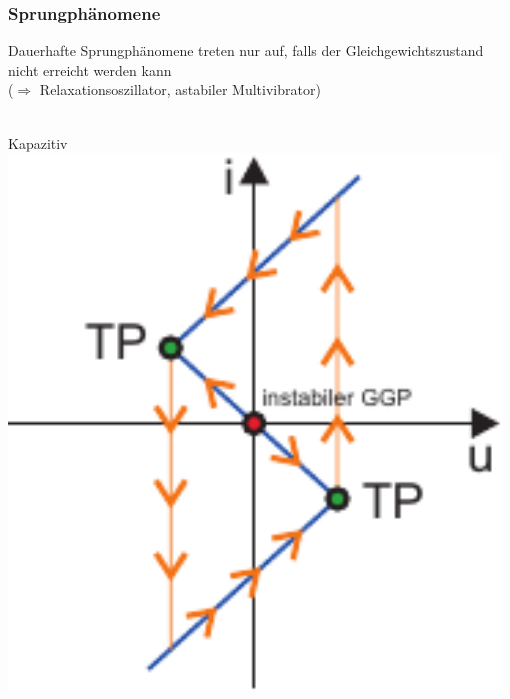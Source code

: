 \documentclass[a4paper,twocolumn,10pt]{article}
\begin{document}
\subsubsection*{Sprungphänomene}
Dauerhafte Sprungphänomene treten nur auf, falls der Gleichgewichtszustand nicht erreicht werden kann\\
($\Rightarrow$ Relaxationsoszillator, astabiler Multivibrator)\\\\
\begin{minipage}[t]{0.23\textwidth}
Kapazitiv\\
\includegraphics[width=0.98\textwidth]{Grafiken/PfadSprung1}\\\\
\end{minipage}
\hfill
\end{document}
